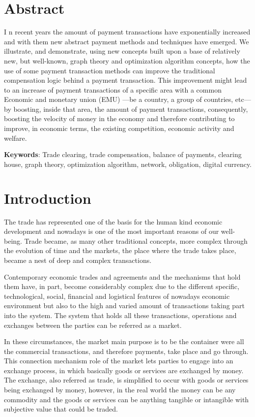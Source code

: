 \documentclass[12pt]{article}
\begin{document}
\begin{multicols}{2}
\section*{Abstract}

\lettrine[lines=2]{I}{ }n recent years the amount of payment transactions have exponentially increased and with them new abstract payment methods and techniques have emerged. We illustrate, and demonstrate, using  new concepts built upon a base of relatively new, but well-known, graph theory and optimization algorithm concepts, how the use of some payment transaction methods can improve the  traditional compensation logic behind a payment transaction. This improvement might lead to an increase of payment transactions of a specific area with a common Economic and monetary union (EMU) ---be a country, a group of countries, etc--- by boosting, inside that area, the amount of payment transactions, consequently, boosting the velocity of money in the economy and therefore contributing to improve, in economic terms, the existing competition, economic activity and welfare.


\textbf{Keywords}: Trade clearing, trade compensation, balance of payments, clearing house, graph theory, optimization algorithm, network, obligation, digital currency.

\section{Introduction}

The trade has represented one of the basis for the human kind economic development and nowadays is one of the most important reasons of our well-being. Trade became, as many other traditional concepts, more complex through the evolution of time and the markets, the place where the trade takes place, became a nest of deep and complex transactions.

Contemporary economic trades and agreements and the mechanisms that hold them have, in part, become considerably complex due to the different specific, technological, social, financial and logistical features of nowadays economic environment but also to the high and varied  amount of transactions taking part into the system. The system that holds all these transactions, operations and exchanges between the parties can be referred as a market.

In these circumstances, the market main purpose is to be the container were all the commercial transactions, and therefore payments, take place and go through. This connection mechanism role of the market lets parties to engage into an exchange process, in which basically goods or services are exchanged by money. The exchange, also referred as trade, is simplified to occur with goods or services being exchanged by money, however, in the real world the money can be any commodity and the goods or services can be anything tangible or intangible with subjective value that could be traded.   


\end{multicols}
\end{document}
